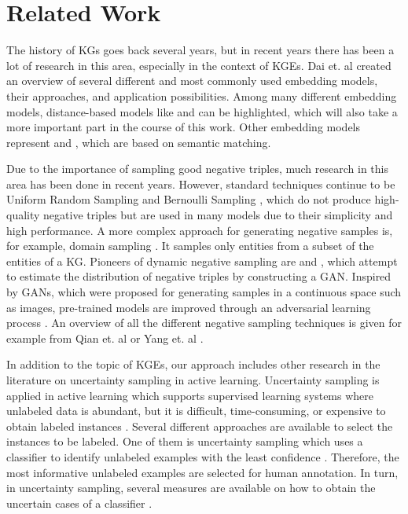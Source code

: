 \section{Related Work} 
\label{sec:relatedwork}

The history of \acp{KG} goes back several years, but in recent years there has been a lot of research in this area, especially in the context of \acp{KGE}.  
Dai et. al \cite{electronics9050750} created an overview of several different and most commonly used embedding models, their approaches, and application possibilities.
Among many different embedding models, distance-based models like \transe \cite{TransE} and \transd \cite{TransD} can be highlighted, which will also take a more important part in the course of this work.
Other embedding models represent \distmult \cite{DistMult} and \complex \cite{ComplEx}, which are based on semantic matching. 

Due to the importance of sampling good negative triples, much research in this area has been done in recent years.
However, standard techniques continue to be Uniform Random Sampling \cite{TransE} and Bernoulli Sampling \cite{TransH}, which do not produce high-quality negative triples but are used in many models due to their simplicity and high performance.  
A more complex approach for generating negative samples is, for example, domain sampling \cite{domainSampling}.
It samples only entities from a subset of the entities of a \ac{KG}.
Pioneers of dynamic negative sampling are \kbgan \cite{cai2017kbgan} and \igan \cite{IGAN}, which attempt to estimate the distribution of negative triples by constructing a \ac{GAN}.
Inspired by \acp{GAN}, which were proposed for generating samples in a continuous space such as images, pre-trained models are improved through an adversarial learning process \cite{cai2017kbgan}.
An overview of all the different negative sampling techniques is given for example from Qian et. al \cite{qiannegative} or Yang et. al \cite{MCNS}.

In addition to the topic of \acp{KGE}, our approach includes other research in the literature on uncertainty sampling in active learning.
Uncertainty sampling is applied in active learning which supports supervised learning systems where unlabeled data is abundant, but it is difficult, time-consuming, or expensive to obtain labeled instances \cite{Settles2009ActiveLL}.
Several different approaches are available to select the instances to be labeled.
One of them is uncertainty sampling which uses a classifier to identify unlabeled examples with the least confidence \cite{5272205}.
Therefore, the most informative unlabeled examples are selected for human annotation.
In turn, in uncertainty sampling, several measures are available on how to obtain the uncertain cases of a classifier \cite{nguyen2021howtomeasure}.